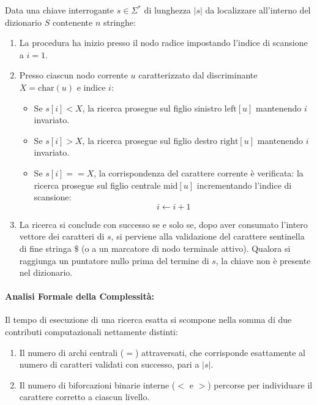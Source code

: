 Data una chiave interrogante $s \in \Sigma^*$ di lunghezza $|s|$ da localizzare all'interno del dizionario $S$ contenente $n$ stringhe:
\begin{enumerate}
  \item La procedura ha inizio presso il nodo radice impostando l'indice di scansione a $i = 1$.
  \item Presso ciascun nodo corrente $u$ caratterizzato dal discriminante $X = \text{char}(u)$ e indice $i$:
  \begin{itemize}
    \item Se $s[i] < X$, la ricerca prosegue sul figlio sinistro $\text{left}[u]$ mantenendo $i$ invariato.
    \item Se $s[i] > X$, la ricerca prosegue sul figlio destro $\text{right}[u]$ mantenendo $i$ invariato.
    \item Se $s[i] == X$, la corrispondenza del carattere corrente \`e verificata: la ricerca prosegue sul figlio centrale $\text{mid}[u]$ incrementando l'indice di scansione:
    \begin{equation}
      i \leftarrow i + 1
    \end{equation}
  \end{itemize}
  \item La ricerca si conclude con successo se e solo se, dopo aver consumato l'intero vettore dei caratteri di $s$, si perviene alla validazione del carattere sentinella di fine stringa $\$$ (o a un marcatore di nodo terminale attivo). Qualora si raggiunga un puntatore nullo prima del termine di $s$, la chiave non \`e presente nel dizionario.
\end{enumerate}

\paragraph{Analisi Formale della Complessità:}
Il tempo di esecuzione di una ricerca esatta si scompone nella somma di due contributi computazionali nettamente distinti:
\begin{enumerate}
  \item Il numero di archi centrali ($=$) attraversati, che corrisponde esattamente al numero di caratteri validati con successo, pari a $|s|$.
  \item Il numero di biforcazioni binarie interne ($<$ e $>$) percorse per individuare il carattere corretto a ciascun livello.
\end{enumerate}

